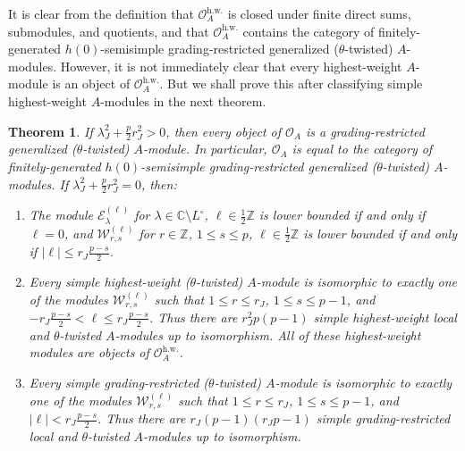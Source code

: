 \documentclass[11pt, reqno]{amsart}
\newtheorem{thm}{Theorem}[section]
\theoremstyle{definition}\newtheorem{defi}[thm]{Definition}
\theoremstyle{definition}\newtheorem{rem}[thm]{Remark}
\theoremstyle{definition}\newtheorem{exam}[thm]{Example}
\theoremstyle{definition}\newtheorem{assum}[thm]{Assumption}
\newcommand{\cE}{\mathcal{E}}
\newcommand{\cO}{\mathcal{O}}
\newcommand{\cW}{\mathcal{W}}
\newcommand{\CC}{\mathbb{C}}
\newcommand{\ZZ}{\mathbb{Z}}
\begin{document}
It is clear from the definition that $\cO_A^{\mathrm{h.w.}}$ is closed under finite direct sums, submodules, and quotients, and that $\cO_A^{\mathrm{h.w.}}$ contains the category of finitely-generated $h(0)$-semisimple grading-restricted generalized ($\theta$-twisted) $A$-modules. However, it is not immediately clear that every highest-weight $A$-module is an object of $\cO_A^{\mathrm{h.w.}}$. But we shall prove this after classifying simple highest-weight $A$-modules in the next theorem.

\begin{thm}\label{thm:grading-restricted}
If $\lambda_J^2+\frac{p}{2}r_J^2>0$, then every object of $\cO_A$ is a grading-restricted generalized ($\theta$-twisted) $A$-module. In particular, $\cO_A$ is equal to the category of finitely-generated $h(0)$-semisimple grading-restricted generalized ($\theta$-twisted) $A$-modules. If $\lambda_J^2+\frac{p}{2}r_J^2=0$, then:

\begin{enumerate}

\item The module $\cE^{(\ell)}_\lambda$ for $\lambda\in\CC\setminus L^{\circ}$, $\ell\in\frac{1}{2}\ZZ$ is lower bounded if and only if $\ell=0$, and $\cW^{(\ell)}_{r,s}$ for $r\in\ZZ$, $1\leq s\leq p$, $\ell\in\frac{1}{2}\ZZ$ is lower bounded if and only if $\vert\ell\vert\leq r_J\frac{p-s}{2}$.

\item Every simple highest-weight ($\theta$-twisted) $A$-module is isomorphic to exactly one of the modules $\cW_{r,s}^{(\ell)}$ such that $1\leq r\leq r_J$, $1\leq s\leq p-1$, and $-r_J\frac{p-s}{2}<\ell\leq r_J\frac{p-s}{2}$. Thus there are $r_J^2 p(p-1)$ simple highest-weight local and $\theta$-twisted $A$-modules up to isomorphism. All of these highest-weight modules are objects of $\cO_A^{\mathrm{h.w.}}$.

\item Every simple grading-restricted ($\theta$-twisted) $A$-module is isomorphic to exactly one of the modules $\cW_{r,s}^{(\ell)}$ such that $1\leq r\leq r_J$, $1\leq s\leq p-1$, and $\vert\ell\vert<r_J\frac{p-s}{2}$. Thus there are $r_J(p-1)(r_Jp-1)$ simple grading-restricted local and $\theta$-twisted $A$-modules up to isomorphism.
\end{enumerate}



\end{thm}
\end{document}
